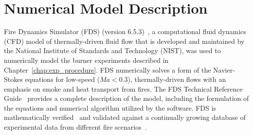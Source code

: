 
\renewcommand{\thechapter}{4}
\label{chap:model_descr}

\chapter{Numerical Model Description}
Fire Dynamics Simulator (FDS) (version 6.5.3)~\cite{FDS_Users_Guide}, a computational fluid dynamics (CFD) model of thermally-driven fluid flow that is developed and maintained by the National Institute of Standards and Technology (NIST), was used to numerically model the burner experiments described in Chapter~\ref{chap:exp_procedure}. FDS numerically solves a form of the Navier-Stokes equations for low-speed ($Ma < 0.3$), thermally-driven flows with an emphasis on smoke and heat transport from fires. The FDS Technical Reference Guide~\cite{FDS_Tech_Guide} provides a complete description of the model, including the formulation of the equations and numerical algorithm utilized by the software. FDS is mathematically verified~\cite{FDS_Verification_Guide} and validated against a continually growing database of experimental data from different fire scenarios~\cite{FDS_Validation_Guide}. 


